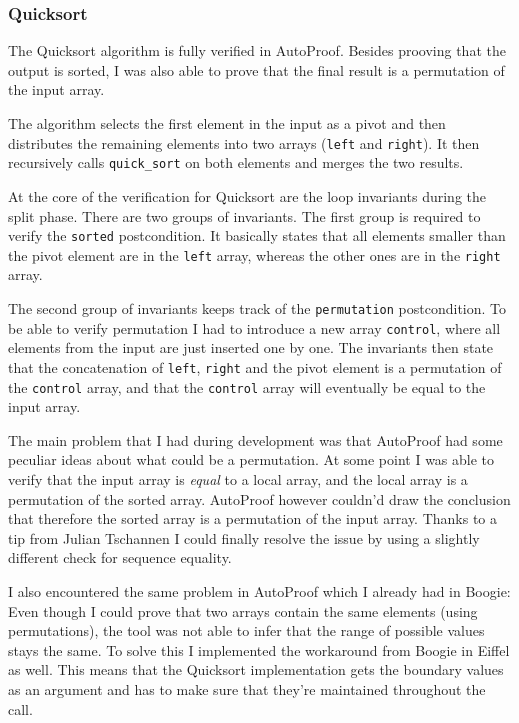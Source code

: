 \documentclass[a4paper,10pt]{article}
\begin{document}
\subsubsection{Quicksort}

The Quicksort algorithm is fully verified in AutoProof.
Besides prooving that the output is sorted, I was also able to prove that the final result is a permutation of the input array.

The algorithm selects the first element in the input as a pivot and then distributes the remaining elements into two arrays (\lstinline!left! and \lstinline!right!).
It then recursively calls \lstinline!quick_sort! on both elements and merges the two results.

At the core of the verification for Quicksort are the loop invariants during the split phase.
There are two groups of invariants.
The first group is required to verify the \lstinline!sorted! postcondition.
It basically states that all elements smaller than the pivot element are in the \lstinline!left! array, whereas the other ones are in the \lstinline!right! array.

The second group of invariants keeps track of the \lstinline!permutation! postcondition.
To be able to verify permutation I had to introduce a new array \lstinline!control!, where all elements from the input are just inserted one by one.
The invariants then state that the concatenation of \lstinline!left!, \lstinline!right! and the pivot element is a permutation of the \lstinline!control! array,
and that the \lstinline!control! array will eventually be equal to the input array.

The main problem that I had during development was that AutoProof had some peculiar ideas about what could be a permutation.
At some point I was able to verify that the input array is \emph{equal} to a local array, and the local array is a permutation of the sorted array.
AutoProof however couldn'd draw the conclusion that therefore the sorted array is a permutation of the input array.
Thanks to a tip from Julian Tschannen I could finally resolve the issue by using a slightly different check for sequence equality.

I also encountered the same problem in AutoProof which I already had in Boogie:
Even though I could prove that two arrays contain the same elements (using permutations), the tool was not able to infer that the range of possible values stays the same.
To solve this I implemented the workaround from Boogie in Eiffel as well.
This means that the Quicksort implementation gets the boundary values as an argument and has to make sure that they're maintained throughout the call.
\end{document}
